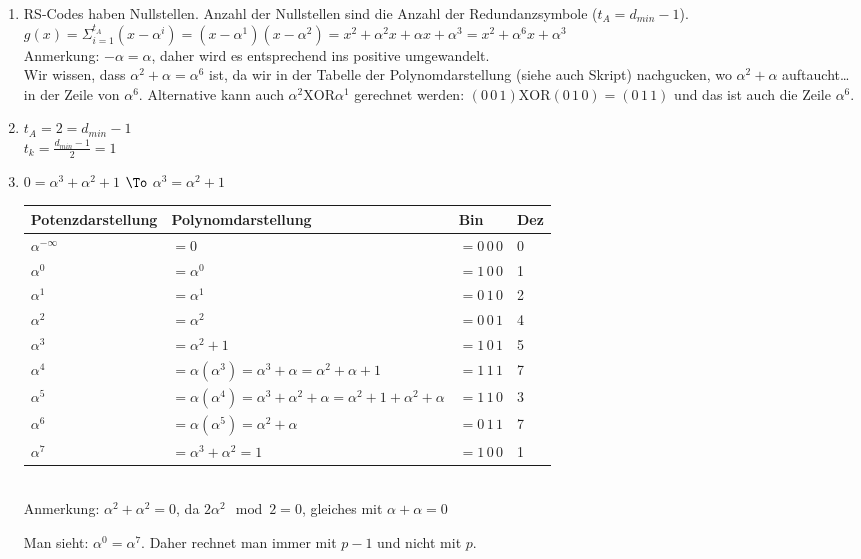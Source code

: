 \documentclass{scrreprt}
\begin{document}
\begin{enumerate}
\item RS-Codes haben Nullstellen. Anzahl der Nullstellen sind die Anzahl der Redundanzsymbole ($t_A=d_{min}-1$).\\
$g(x)=\Sigma_{i=1}^{t_A}(x-\alpha^{i})=(x-\alpha^1)(x-\alpha^2) = x^2 + \alpha^2 x + \alpha x + \alpha^3 = x^2+\alpha^6x+\alpha^3$\\
Anmerkung: $-\alpha = \alpha$, daher wird es entsprechend ins positive umgewandelt.\\
Wir wissen, dass $\alpha^2+\alpha = \alpha^6$ ist, da wir in der Tabelle der Polynomdarstellung (siehe auch Skript) nachgucken, wo $\alpha^2+\alpha$ auftaucht… in der Zeile von $\alpha^6$. Alternative kann auch $\alpha^2\text{XOR}\alpha^1$ gerechnet werden: $(0\,0\,1)\mathrm{XOR}(0\,1\,0)=(0\,1\,1)$ und das ist auch die Zeile $\alpha^6$.
\item $t_A = 2 = d_{min}-1$\\
$t_k = \frac{d_{min}-1}{2}=1$\\
\item $0=\alpha^3+\alpha^2+1$ $\To$ $\alpha^3 = \alpha^2+1$\\
\begin{tabular}{l l l l}
Potenzdarstellung & Polynomdarstellung & Bin & Dez\\\hline
$\alpha^{-\infty}$ & $= 0$& $=0\,0\,0$ & 0\\
$\alpha^0$ & $= \alpha^0$ & $=1\,0\,0$ & 1\\
$\alpha^1$ & $= \alpha^1$ & $=0\,1\,0$ & 2\\
$\alpha^2$ & $= \alpha^2$ & $=0\,0\,1$ & 4\\
$\alpha^3$ & $=\alpha^2+1$ & $=1\,0\,1$ & 5\\
$\alpha^4$ & $=\alpha(\alpha^3) = \alpha^3+\alpha = \alpha^2+\alpha+1$ & $=1\,1\,1$ & 7\\
$\alpha^5$ & $=\alpha(\alpha^4)=\alpha^3+\alpha^2+\alpha = \alpha^2 +1 + \alpha^2 + \alpha$ & $=1\,1\,0$ & 3\\
$\alpha^6$ & $=\alpha(\alpha^5)=\alpha^2+\alpha$ & $=0\,1\,1$ &7\\
$\alpha^7$ & $=\alpha^3+\alpha^2=1$ & $=1\,0\,0$ & 1\\
\end{tabular}\\

Anmerkung: $\alpha^2+\alpha^2=0$, da $2\alpha^2\mod 2 = 0$, gleiches mit $\alpha+\alpha=0$

Man sieht: $\alpha^0=\alpha^7$. Daher rechnet man immer mit $p-1$ und nicht mit $p$.


\end{enumerate}
\end{document}
